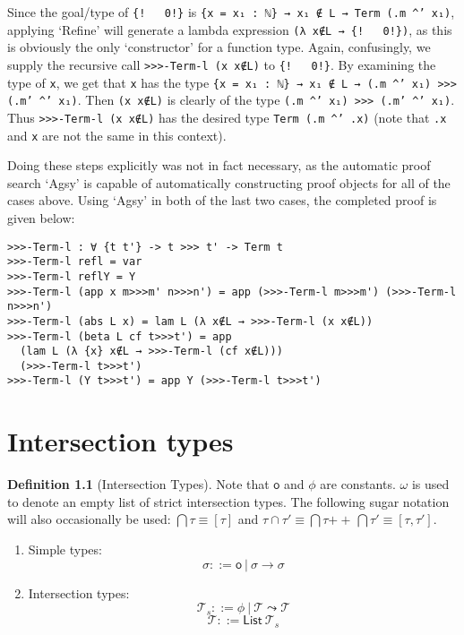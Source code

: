 \documentclass[a4paper, 12pt, twoside]{style/ociamthesis}
\theoremstyle{plain}
\theoremstyle{definition}
\newtheorem{Definition}{Definition}[chapter]
\theoremstyle{remark}
\providecommand{\tightlist}{%
  \setlength{\itemsep}{0pt}\setlength{\parskip}{0pt}}
\newcommand{\concat}{\ensuremath{+\!\!\!\!+\,}}
\begin{document}
Since the goal/type of \texttt{\{!\ \ \ 0!\}} is
\texttt{\{x = x₁ : ℕ\} → x₁ ∉ L → Term (.m \textasciicircum' x₁)},
applying `Refine' will generate a lambda expression
\texttt{(λ x∉L → \{!\ \ \ 0!\})}, as this is obviously the only
`constructor' for a function type. Again, confusingly, we supply the
recursive call \texttt{>>>-Term-l (x x∉L)} to \texttt{\{!\ \ \ 0!\}}. By
examining the type of \texttt{x}, we get that \texttt{x} has the type
\texttt{\{x = x₁ : ℕ\} → x₁ ∉ L → (.m \textasciicircum' x₁) >>> (.m' \textasciicircum' x₁)}.
Then \texttt{(x x∉L)} is clearly of the type
\texttt{(.m \textasciicircum' x₁) >>> (.m' \textasciicircum' x₁)}. Thus
\texttt{>>>-Term-l (x x∉L)} has the desired type
\texttt{Term (.m \textasciicircum' .x)} (note that \texttt{.x} and
\texttt{x} are not the same in this context).

Doing these steps explicitly was not in fact necessary, as the automatic
proof search `Agsy' is capable of automatically constructing proof
objects for all of the cases above. Using `Agsy' in both of the last two
cases, the completed proof is given below:

\begin{verbatim}
>>>-Term-l : ∀ {t t'} -> t >>> t' -> Term t
>>>-Term-l refl = var
>>>-Term-l reflY = Y
>>>-Term-l (app x m>>>m' n>>>n') = app (>>>-Term-l m>>>m') (>>>-Term-l n>>>n')
>>>-Term-l (abs L x) = lam L (λ x∉L → >>>-Term-l (x x∉L))
>>>-Term-l (beta L cf t>>>t') = app 
  (lam L (λ {x} x∉L → >>>-Term-l (cf x∉L))) 
  (>>>-Term-l t>>>t')
>>>-Term-l (Y t>>>t') = app Y (>>>-Term-l t>>>t')
\end{verbatim}

\newpage

\hypertarget{itypes}{\chapter{Intersection types}\label{itypes}}

\begin{Definition}[Intersection Types]

Note that \(\mathsf{o}\) and \(\phi\) are constants. \(\omega\) is used
to denote an empty list of strict intersection types. The following
sugar notation will also occasionally be used:
\(\bigcap \tau \equiv [ \tau ]\) and
\(\tau \cap \tau' \equiv \bigcap \tau \concat \bigcap \tau' \equiv [ \tau, \tau' ]\).

\begin{enumerate}
\def\labelenumi{\roman{enumi})}
\tightlist
\item
  Simple types: \[\sigma ::= \mathsf{o}\ |\ \sigma \to \sigma\]
\item
  Intersection types:
  \[\mathcal{T}_s ::= \phi\ |\ \mathcal{T} \leadsto \mathcal{T}\]
  \[\mathcal{T} ::= \mathsf{List}\ \mathcal{T}_s\]
\end{enumerate}

\end{Definition}
\end{document}
